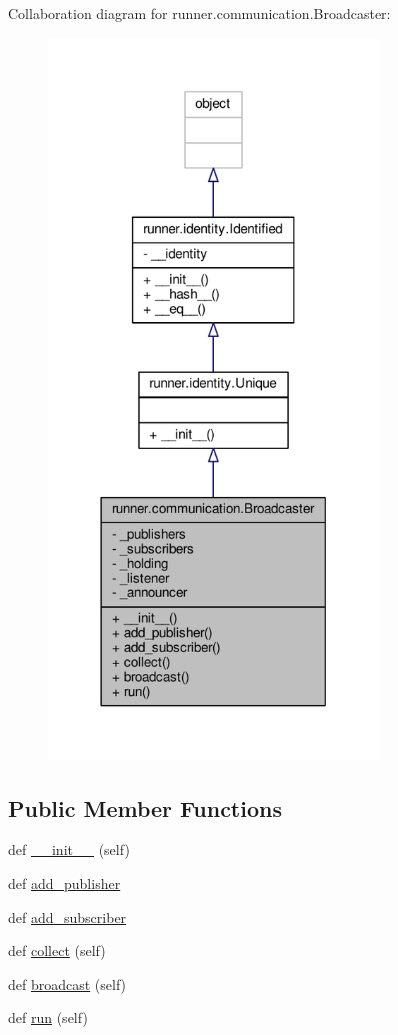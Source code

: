 Collaboration diagram for runner.\+communication.\+Broadcaster\+:
\nopagebreak
\begin{figure}[H]
\begin{center}
\leavevmode
\includegraphics[width=248pt]{classrunner_1_1communication_1_1Broadcaster__coll__graph}
\end{center}
\end{figure}
\subsection*{Public Member Functions}
\begin{DoxyCompactItemize}
\item 
def \hyperlink{classrunner_1_1communication_1_1Broadcaster_a78153cb8bcdcddc0728e0525320de5d1}{\+\_\+\+\_\+init\+\_\+\+\_\+} (self)
\item 
def \hyperlink{classrunner_1_1communication_1_1Broadcaster_abb79c2beb4b1471b7d8da2252f7784f1}{add\+\_\+publisher}
\item 
def \hyperlink{classrunner_1_1communication_1_1Broadcaster_a7c8c5edde2f2bf1b8800808d82cb5580}{add\+\_\+subscriber}
\item 
def \hyperlink{classrunner_1_1communication_1_1Broadcaster_acf866b8bc36436e24c799b62aaa1ad41}{collect} (self)
\item 
def \hyperlink{classrunner_1_1communication_1_1Broadcaster_a24fbf3e0cef3c4ace5f64d378f251e51}{broadcast} (self)
\item 
def \hyperlink{classrunner_1_1communication_1_1Broadcaster_a0944757755e2bc3be5ec04d3d30ed06f}{run} (self)
\end{DoxyCompactItemize}
